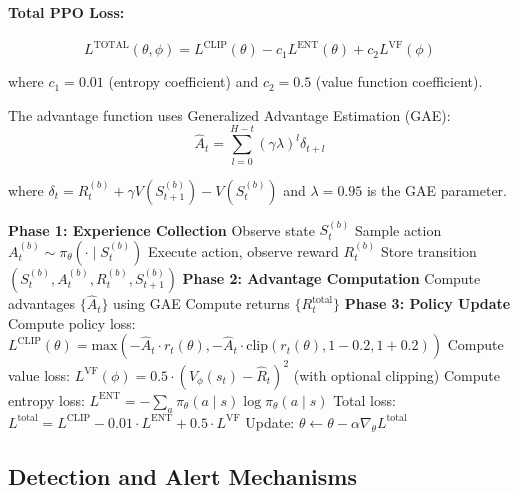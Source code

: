 \documentclass[12pt,oneside]{article}
\begin{document}
\paragraph{Total PPO Loss:}
\begin{equation}
L^{\text{TOTAL}}(\theta, \phi) = L^{\text{CLIP}}(\theta) - c_1 L^{\text{ENT}}(\theta) + c_2 L^{\text{VF}}(\phi)
\end{equation}

where $c_1 = 0.01$ (entropy coefficient) and $c_2 = 0.5$ (value function coefficient).

The advantage function uses Generalized Advantage Estimation (GAE):
\begin{equation}
\hat{A}_t = \sum_{l=0}^{H-t} (\gamma \lambda)^l \delta_{t+l}
\end{equation}

where $\delta_t = R_t^{(b)} + \gamma V(S_{t+1}^{(b)}) - V(S_t^{(b)})$ and $\lambda = 0.95$ is the GAE parameter.

\begin{algorithm}
\caption{PPO Training for Blue Agent}
\begin{algorithmic}[1]
\STATE \textbf{Phase 1: Experience Collection}
        \STATE Observe state $S_t^{(b)}$
        \STATE Sample action $A_t^{(b)} \sim \pi_\theta(\cdot \mid S_t^{(b)})$
        \STATE Execute action, observe reward $R_t^{(b)}$
        \STATE Store transition $(S_t^{(b)}, A_t^{(b)}, R_t^{(b)}, S_{t+1}^{(b)})$
    \ENDFOR
\ENDFOR
\STATE \textbf{Phase 2: Advantage Computation}
\STATE Compute advantages $\{\hat{A}_t\}$ using GAE
\STATE Compute returns $\{R_t^{\text{total}}\}$
\STATE \textbf{Phase 3: Policy Update}
        \STATE Compute policy loss: $L^{\text{CLIP}}(\theta) = \text{max}(-\hat{A}_t \cdot r_t(\theta), -\hat{A}_t \cdot \text{clip}(r_t(\theta), 1-0.2, 1+0.2))$
        \STATE Compute value loss: $L^{\text{VF}}(\phi) = 0.5 \cdot (V_\phi(s_t) - \hat{R}_t)^2$ (with optional clipping)
        \STATE Compute entropy loss: $L^{\text{ENT}} = -\sum_a \pi_\theta(a \mid s) \log \pi_\theta(a \mid s)$
        \STATE Total loss: $L^{\text{total}} = L^{\text{CLIP}} - 0.01 \cdot L^{\text{ENT}} + 0.5 \cdot L^{\text{VF}}$
        \STATE Update: $\theta \leftarrow \theta - \alpha \nabla_\theta L^{\text{total}}$
    \ENDFOR
\ENDFOR
\end{algorithmic}
\end{algorithm}

\subsection{Detection and Alert Mechanisms}
\end{document}
